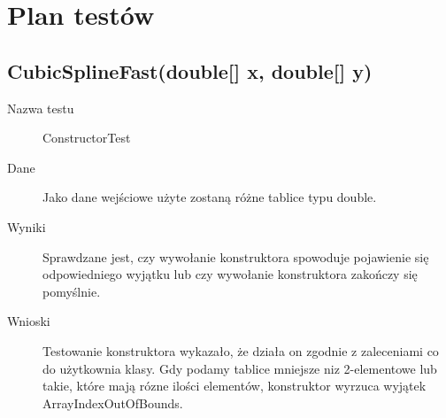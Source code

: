 \documentclass[12pt,a4paper,notitlepage]{article}
\begin{document}
\section{Plan testów}

\subsection{CubicSplineFast(double[] x, double[] y)}
\begin{description}
\item [Nazwa testu] ConstructorTest
\item [Dane] Jako dane wejściowe użyte zostaną różne tablice typu double.
\item [Wyniki] Sprawdzane jest, czy wywołanie konstruktora spowoduje pojawienie się odpowiedniego wyjątku lub czy wywołanie konstruktora zakończy się pomyślnie.
\item [Wnioski] Testowanie konstruktora wykazało, że działa on zgodnie z zaleceniami co do użytkownia klasy. Gdy podamy tablice mniejsze niz 2-elementowe lub takie, które mają rózne ilości elementów, konstruktor wyrzuca wyjątek ArrayIndexOutOfBounds.
\end{description}
\end{document}

